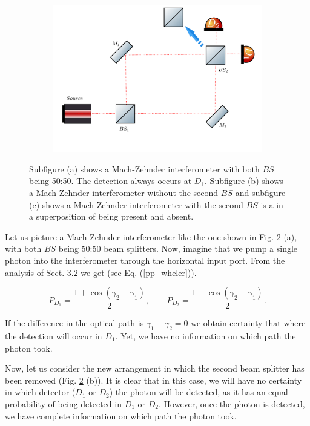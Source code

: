 \documentclass[12pt]{book}
\begin{document}
\begin{figure}[t!]
\begin{subfigure}{0.45\linewidth}
\includegraphics[width=\linewidth]{images/wheeler3.png}
\caption{}
\label{wheeler3}
\end{subfigure}
\caption{Subfigure (a) shows a Mach-Zehnder interferometer with both $BS$ being 50:50. The detection always occurs at $D_{1}$. Subfigure (b) shows a Mach-Zehnder interferometer without the second $BS$ and subfigure (c) shows a Mach-Zehnder interferometer with the second $BS$ is a in a superposition of being present and absent.}
\label{Wheeler}
\end{figure}

Let us picture a Mach-Zehnder interferometer like the one shown in Fig. \ref{Wheeler} (a), with both $BS$ being 50:50 beam splitters. Now, imagine that we pump a single photon into the interferometer through the horizontal input port. From the analysis of Sect. 3.2 we get (see Eq. (\ref{pp_wheler})).

\begin{equation}
P_{D_{1}}=\frac{1+\cos(\gamma_{2}-\gamma_{1})}{2}, \qquad P_{D_{2}}=\frac{1-\cos(\gamma_{2}-\gamma_{1})}{2}. \label{pp_wheler}
\end{equation}

 If the difference in the optical path is $\gamma_{1}-\gamma_{2}=0$  we obtain certainty that where the detection will occur in $D_{1}$. Yet, we have no information on which path the photon took.



Now, let us consider the new arrangement in which the second beam splitter has been removed (Fig. \ref{Wheeler} (b)). It is clear that in this case, we will have no certainty in which detector ($D_{1}$ or $D_{2}$) the photon will be detected, as it has an equal probability of being detected in $D_{1}$ or $D_{2}$. However, once the photon is detected, we have complete information on which path the photon took.
\end{document}
